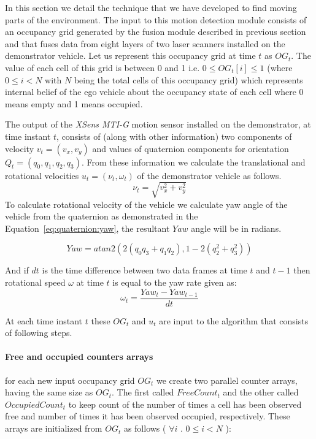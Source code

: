 In this section we detail the technique that we have developed to find moving parts
of the environment. The input to this motion detection module consists of an occupancy grid
generated by the fusion module described in previous section and that fuses data from eight layers of two laser scanners
installed on the demonstrator vehicle. Let us represent this occupancy grid at time $t$ as 
$OG_t$. The value of 
each cell of this grid is between 0 and 1 i.e. $0 \leq OG_t[i] \leq 1$ (where $0 \leq i<N$ with $N$ being the total cells of this occupancy grid) which represents internal belief of 
the ego vehicle about the occupancy state of each cell where 0 means empty and 1 means occupied.


The output of the \textit{XSens MTI-G} motion sensor installed on the demonstrator, at time instant $t$,
consists of (along with other information) two components of velocity $v_t=(v_x, v_y)$ and values of
quaternion components for orientation $Q_t=(q_0, q_1, q_2, q_3)$. From these information we calculate the
translational and rotational velocities $u_t=(\nu_t, \omega_t)$ of the demonstrator vehicle as follows.
\begin{equation}
\nu_t = \sqrt{v_x^2+v_y^2}
\end{equation}
To calculate rotational velocity of the vehicle we calculate yaw angle of the vehicle from the quaternion
as demonstrated in the Equation~\ref{eq:quaternion:yaw}, the resultant $Yaw$ angle will be in radians.

\begin{equation}
Yaw = atan2(2(q_0 q_3+q_1 q_2),1-2(q_2^2+q_3^2))
\label{eq:quaternion:yaw}
\end{equation}

And if $dt$ is the time difference between two data frames at time $t$ and $t-1$ then rotational speed $\omega$
at time $t$ is equal to the yaw rate given as:
\begin{equation}
\omega_t = \frac{Yaw_t-Yaw_{t-1}}{dt}
\end{equation}

At each time instant $t$ these $OG_t$ and $u_t$ are input to the algorithm that consists of 
following steps.

\paragraph{Free and occupied counters arrays} for each new input occupancy grid $OG_t$ we 
create two parallel counter arrays, having the same size as $OG_t$. The first called $FreeCount_t$ and the other called $OccupiedCount_t$ to keep count of the number of times a cell has been observed free and number of times it has been observed occupied, respectively. These arrays are initialized from $OG_t$ as follows ( $\forall i$  . $0 \leq i<N$ ):

